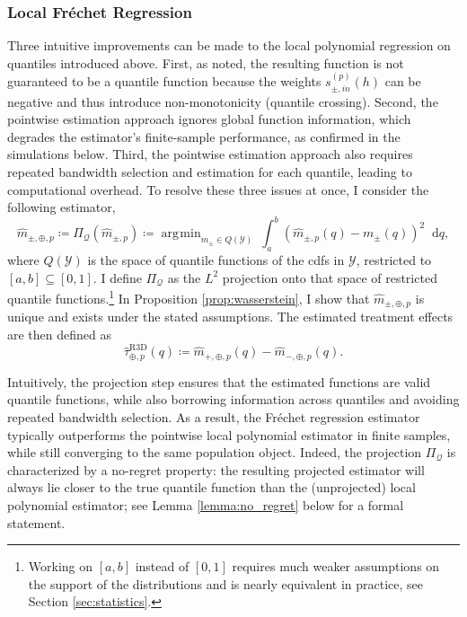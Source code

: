 \documentclass[12pt]{article}
\newcommand*\dd{\mathop{}\!\mathrm{d}}
\DeclareMathOperator*{\argmin}{\arg\!\min}
\begin{document}
\subsubsection{Local Fr\'echet Regression}  \label{sec:estimator_frechet}

Three intuitive improvements can be made to the local polynomial regression on quantiles introduced above. First, as noted, the resulting function is not guaranteed to be a quantile function because the weights $s^{(p)}_{\pm,in}(h)$ can be negative and thus introduce non-monotonicity (quantile crossing). Second, the pointwise estimation approach ignores global function information, which degrades the estimator's finite-sample performance, as confirmed in the simulations below. Third, the pointwise estimation approach also requires repeated bandwidth selection and estimation for each quantile, leading to computational overhead. To resolve these three issues at once, I consider the following estimator,
\begin{equation} \label{eq:isotonic_regression}
\hat{m}_{\pm, \oplus, p} \coloneqq \Pi_{\mathcal{Q}}\left( \hat{m}_{\pm,p} \right) \coloneqq \argmin_{m_{\pm} \in Q(\mathcal{Y})} \: \int_{a}^b \left(\hat{m}_{\pm,p}(q) - m_{\pm}(q) \right)^2 \dd q, 
\end{equation}
where $Q(\mathcal{Y})$ is the space of quantile functions of the cdfs in $\mathcal{Y}$, restricted to $[a,b] \subseteq [0,1]$. I define $\Pi_{\mathcal{Q}}$ as the $L^2$ projection onto that space of restricted quantile functions.\footnote{Working on $[a,b]$ instead of $[0,1]$ requires much weaker assumptions on the support of the distributions and is nearly equivalent in practice, see Section \ref{sec:statistics}. } In Proposition \ref{prop:wasserstein}, I show that $\hat{m}_{\pm, \oplus, p}$ is unique and exists under the stated assumptions. 
The estimated treatment effects are then defined as
\begin{equation} \label{eq:frechet_treatment_effects}
\hat{\tau}^{\mathrm{R3D}}_{\oplus,p}(q) \coloneqq \hat{m}_{+,\oplus,p}(q)-\hat{m}_{-, \oplus,p}(q).
\end{equation}

Intuitively, the projection step ensures that the estimated functions are valid quantile functions, while also borrowing information across quantiles and avoiding repeated bandwidth selection. As a result, the Fr\'echet regression estimator typically outperforms the pointwise local polynomial estimator in finite samples, while still converging to the same population object. Indeed, the projection $\Pi_\mathcal{Q}$ is characterized by a no-regret property: the resulting projected estimator will always lie closer to the true quantile function than the (unprojected) local polynomial estimator; see Lemma \ref{lemma:no_regret} below for a formal statement. 
\end{document}

